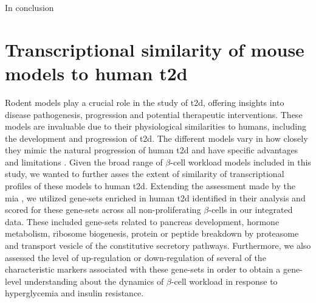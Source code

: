 \par In conclusion

\clearpage

\section[Transcriptional similarity of mouse models to human \glslink{t2d}{T2D}]{Transcriptional similarity of mouse models to human \gls{t2d}}
\label{sec:chp3_T2Dgenes}
Rodent models play a crucial role in the study of \gls{t2d}, offering insights into disease pathogenesis, progression and potential therapeutic interventions. These models are invaluable due to their physiological similarities to humans, including the development and progression of \gls{t2d}. The different models vary in how closely they mimic the natural progression of human \gls{t2d} and have specific advantages and limitations \textbf{\cite{kleinert_animal_2018, singh_animal_2024}}. Given the broad range of $\beta$-cell workload models included in this study, we wanted to further asses the extent of similarity of transcriptional profiles of these models to human \gls{t2d}. Extending the assessment made by the \gls{mia} \textbf{\cite{hrovatin_delineating_2023}}, we utilized gene-sets enriched in human \gls{t2d} identified in their analysis and scored for these gene-sets across all non-proliferating $\beta$-cells in our integrated data. These included gene-sets related to pancreas development, hormone metabolism, ribosome biogenesis, protein or peptide breakdown by proteasome and transport vesicle of the constitutive secretory pathways. Furthermore, we also assessed the level of up-regulation or down-regulation of several of the characteristic markers associated with these gene-sets in order to obtain a gene-level understanding about the dynamics of $\beta$-cell workload in response to hyperglycemia and insulin resistance.    %


